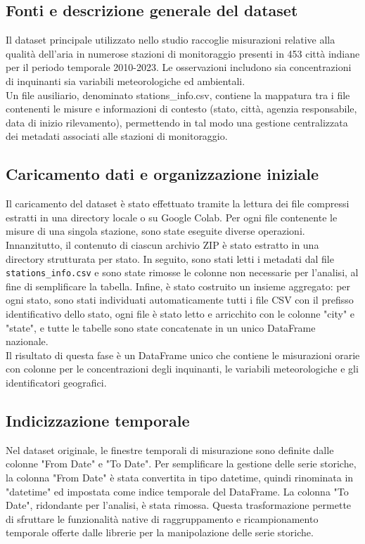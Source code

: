 \documentclass[a4paper,12pt]{report}
\begin{document}
	\subsection{Fonti e descrizione generale del dataset}
	Il dataset principale utilizzato nello studio raccoglie misurazioni relative alla qualità dell'aria in numerose stazioni di monitoraggio presenti in 453 città indiane per il periodo temporale 2010-2023. Le osservazioni includono sia concentrazioni di inquinanti sia variabili meteorologiche ed ambientali.\\
	Un file ausiliario, denominato stations\_info.csv, contiene la mappatura tra i file contenenti le misure e informazioni di contesto (stato, città, agenzia responsabile, data di inizio rilevamento), permettendo in tal modo una gestione centralizzata dei metadati associati alle stazioni di monitoraggio.
	
	\subsection{Caricamento dati e organizzazione iniziale}
	Il caricamento del dataset è stato effettuato tramite la lettura dei file compressi estratti in una directory locale o su Google Colab. Per ogni file contenente le misure di una singola stazione, sono state eseguite diverse operazioni. Innanzitutto, il contenuto di ciascun archivio ZIP è stato estratto in una directory strutturata per stato. In seguito, sono stati letti i metadati dal file \texttt{stations\_info.csv} e sono state rimosse le colonne non necessarie per l'analisi, al fine di semplificare la tabella. Infine, è stato costruito un insieme aggregato: per ogni stato, sono stati individuati automaticamente tutti i file CSV con il prefisso identificativo dello stato, ogni file è stato letto e arricchito con le colonne "city" e "state", e tutte le tabelle sono state concatenate in un unico DataFrame nazionale. \\
	Il risultato di questa fase è un DataFrame unico che contiene le misurazioni orarie con colonne per le concentrazioni degli inquinanti, le variabili meteorologiche e gli identificatori geografici.
	
	\subsection{Indicizzazione temporale}
	Nel dataset originale, le finestre temporali di misurazione sono definite dalle colonne "From Date" e "To Date". Per semplificare la gestione delle serie storiche, la colonna "From Date" è stata convertita in tipo datetime, quindi rinominata in "datetime" ed impostata come indice temporale del DataFrame. La colonna "To Date", ridondante per l'analisi, è stata rimossa. Questa trasformazione permette di sfruttare le funzionalità native di raggruppamento e ricampionamento temporale offerte dalle librerie per la manipolazione delle serie storiche.
	
\end{document}
